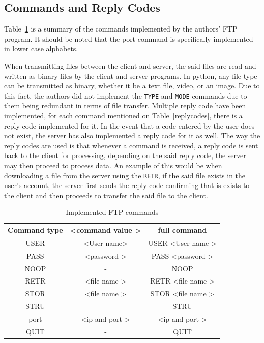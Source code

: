 \documentclass[journal, a4paper]{IEEEtran}
\begin{document}
\subsection{Commands and Reply Codes}
Table~\ref{commandTable} is a summary of the commands implemented by the authors' FTP program. It should be noted that the port command is specifically implemented in lower case alphabets.

When transmitting files between the client and server, the said files are read and written as binary files by the client and server programs. In python, any file type can be transmitted as binary, whether it be a text file, video, or an image. Due to this fact, the authors did not implement the \texttt{TYPE} and \texttt{MODE} commands due to them being redundant in terms of file transfer. Multiple reply code have been implemented, for each command mentioned on Table~\ref{replycodes}, there is a reply code implemented for it. In the event that a code entered by the user does not exist, the server has also implemented a reply code for it as well. The way the reply codes are used is that whenever a command is received, a reply code is sent back to the client for processing, depending on the said reply code, the server may then proceed to process data. An example of this would be when downloading a file from the server using the \texttt{RETR}, if the said file exists in the user's account, the server first sends the reply code confirming that is exists to the client and then proceeds to transfer the said file to the client.

\begin{table}[hbtp!]
	\caption{Implemented FTP commands}
	\label{commandTable}
	\begin{center}
		\begin{tabular}{| c | c | c |}
			\hline
			Command type &  \textless command value \textgreater & full command\\
			\hline
				USER & \textless User name\textgreater& USER   \textless User name \textgreater \\
			\hline
				PASS & \textless password \textgreater & PASS   \textless password \textgreater  \\
			\hline
				NOOP & - & NOOP \\
			\hline
				RETR & \textless file name \textgreater & RETR   \textless file name \textgreater \\
			\hline
				STOR & \textless file name \textgreater & STOR   \textless file name \textgreater \\
			\hline
				STRU & -  & STRU  \\
			\hline
				port & \textless ip and port \textgreater & \textless ip and port \textgreater \\
			\hline
				QUIT & -  & QUIT\\
			\hline
		\end{tabular}
	\end{center}
\end{table}
\end{document}
